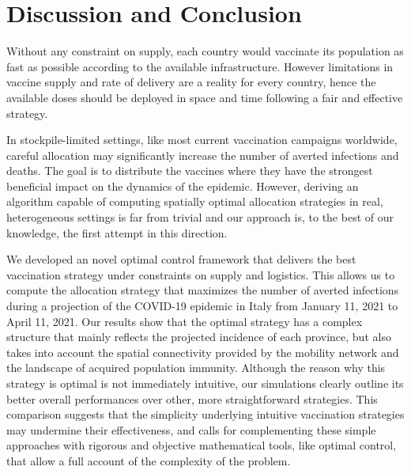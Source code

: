 \section{Discussion and Conclusion}
Without any constraint on supply, each country would vaccinate its population as fast as possible according to the available infrastructure. However limitations in vaccine supply and rate of delivery are a reality for every country, hence the available doses should be deployed in space and time following a fair and effective strategy. 

In stockpile-limited settings, like most current vaccination campaigns worldwide, careful allocation may significantly increase the number of averted infections and deaths. The goal is to distribute the vaccines where they have the strongest beneficial impact on the dynamics of the epidemic. However, deriving an algorithm capable of computing spatially optimal allocation strategies in real, heterogeneous settings is far from trivial and our approach is, to the best of our knowledge, the first attempt in this direction. 

We developed an novel optimal control framework that delivers the best vaccination strategy under constraints on supply and logistics. This allows us to compute the allocation strategy that maximizes the number of averted infections during a projection of the COVID-19 epidemic in Italy from January 11, 2021 to April 11, 2021. Our results show that the optimal strategy has a complex structure that mainly reflects the projected incidence of each province, but also takes into account the spatial connectivity provided by the mobility network and the landscape of acquired population immunity. Although the reason why this strategy is optimal is not immediately intuitive, our simulations clearly outline its better overall performances over other, more straightforward strategies. This comparison suggests that the simplicity underlying intuitive vaccination strategies may undermine their effectiveness, and calls for complementing these simple approaches with rigorous and objective mathematical tools, like optimal control, that allow a full account of the complexity of the problem.

